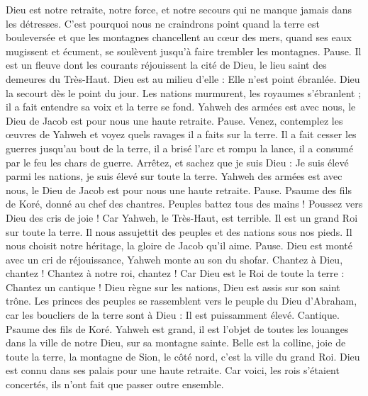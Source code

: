 \begin{multicols}{2}
Dieu est notre retraite, notre force, et notre secours qui ne manque jamais dans les détresses.
C'est pourquoi nous ne craindrons point quand la terre est bouleversée et que les montagnes chancellent au cœur des mers,
quand ses eaux mugissent et écument, se soulèvent jusqu’à faire trembler les montagnes. Pause.
Il est un fleuve dont les courants réjouissent la cité de Dieu, le lieu saint des demeures du Très-Haut.
Dieu est au milieu d'elle : Elle n’est point ébranlée. Dieu la secourt dès le point du jour.
Les nations murmurent, les royaumes s’ébranlent ; il a fait entendre sa voix et la terre se fond.
Yahweh des armées est avec nous, le Dieu de Jacob est pour nous une haute retraite. Pause.
Venez, contemplez les œuvres de Yahweh et voyez quels ravages il a faits sur la terre.
Il a fait cesser les guerres jusqu’au bout de la terre, il a brisé l’arc et rompu la lance, il a consumé par le feu les chars de guerre.
Arrêtez, et sachez que je suis Dieu : Je suis élevé parmi les nations, je suis élevé sur toute la terre.
Yahweh des armées est avec nous, le Dieu de Jacob est pour nous une haute retraite. Pause.
\VerseOne{}Psaume des fils de Koré, donné au chef des chantres.
Peuples battez tous des mains ! Poussez vers Dieu des cris de joie !
Car Yahweh, le Très-Haut, est terrible. Il est un grand Roi sur toute la terre.
Il nous assujettit des peuples et des nations sous nos pieds.
Il nous choisit notre héritage, la gloire de Jacob qu’il aime. Pause.
Dieu est monté avec un cri de réjouissance, Yahweh monte au son du shofar.
Chantez à Dieu, chantez ! Chantez à notre roi, chantez !
Car Dieu est le Roi de toute la terre : Chantez un cantique !
Dieu règne sur les nations, Dieu est assis sur son saint trône.
Les princes des peuples se rassemblent vers le peuple du Dieu d'Abraham, car les boucliers de la terre sont à Dieu : Il est puissamment élevé.
\VerseOne{}Cantique. Psaume des fils de Koré.
Yahweh est grand, il est l’objet de toutes les louanges dans la ville de notre Dieu, sur sa montagne sainte.
Belle est la colline, joie de toute la terre, la montagne de Sion, le côté nord, c'est la ville du grand Roi.
Dieu est connu dans ses palais pour une haute retraite.
Car voici, les rois s'étaient concertés, ils n’ont fait que passer outre ensemble.

\end{multicols}
